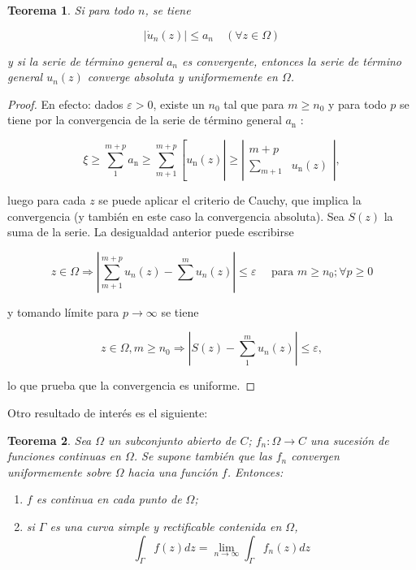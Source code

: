 \documentclass[10pt]{article}
\theoremstyle{plain}
\newtheorem{theorem}{Teorema}[section]
\theoremstyle{definition}
\theoremstyle{remark}
\begin{document}
\begin{theorem}
  Si para todo $n$, se tiene

\begin{equation*}
\left|\dot{u}_{n}(z)\right| \leqslant a_{n} \quad(\forall z \in \Omega) \tag{$\forall z\in\Omega$}
\end{equation*}

y si la serie de término general $a_{n}$ es convergente, entonces la serie de término general $u_{n}(z)$ converge absoluta y uniformemente en $\Omega$.
\end{theorem}
\begin{proof}
En efecto: dados $\varepsilon>0$, existe un $n_{0}$ tal que para $m \geqslant n_{0}$ y para todo $p$ se tiene por la convergencia de la serie de término general $a_{\mathrm{n}}$ :

$$
\xi \geqslant \sum_{1}^{m+p} a_{\mathrm{n}} \geqslant \sum_{m+1}^{m+p}\left[u _ { \mathrm { n } } ( z ) \left|\geqslant\left|\begin{array}{cc}
m+p & \\
\sum_{m+1} & u_{\mathrm{n}}(z)
\end{array}\right|,\right.\right.
$$

luego para cada $z$ se puede aplicar el criterio de Cauchy, que implica la convergencia (y también en este caso la convergencia absoluta). Sea $S(z)$ la suma de la serie. La desigualdad anterior puede escribirse

$$
z \in \Omega \Rightarrow\left|\sum_{m+1}^{m+p} u_{n}(z)-\sum^{m} u_{n}(z)\right| \leqslant \varepsilon \quad \text { para } m \geqslant n_{0} ; \forall p \geqslant 0
$$

y tomando límite para $p \rightarrow \infty$ se tiene

$$
z \in \Omega, m \geqslant n_{0} \Rightarrow\left|S(z)-\sum_{1}^{m} u_{n}(z)\right| \leqslant \varepsilon,
$$

lo que prueba que la convergencia es uniforme.
\end{proof}


Otro resultado de interés es el siguiente:

\begin{theorem}
Sea $\Omega$ un subconjunto abierto de $C$; $f_n: \Omega \rightarrow C$ una sucesión de funciones continuas en $\Omega$. Se supone también que las $f_n$ convergen uniformemente sobre $\Omega$ hacia una función $f$. Entonces:
\begin{enumerate}
\item[(a)] $f$ es continua en cada punto de $\Omega$;
\item[(b)] si $\Gamma$ es una curva simple y rectificable contenida en $\Omega$,
\begin{equation*}
\int_{\Gamma} f(z) d z=\lim _{n \rightarrow \infty} \int_{\Gamma} f_{n}(z) d z \tag{8-1}
\end{equation*}
\end{enumerate}
\end{theorem}
\end{document}
